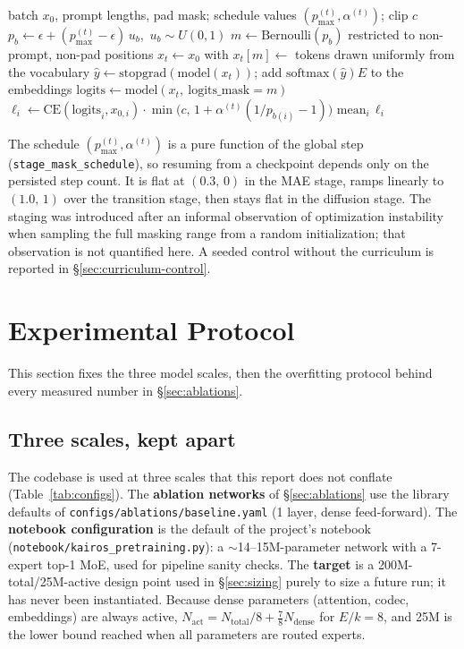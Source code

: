 \documentclass[11pt]{article}
\begin{document}
\begin{algorithm}[t]
\caption{Denoising training step (\texttt{compute\_loss})}
\label{alg:diffusion}
\begin{algorithmic}[1]
\Require batch $x_0$, prompt lengths, pad mask; schedule values $(p_{\max}^{(t)},\alpha^{(t)})$; clip $c$
\State $p_b\gets\epsilon+(p_{\max}^{(t)}-\epsilon)\,u_b$,\ $u_b\sim U(0,1)$ 
\State $m\gets\text{Bernoulli}(p_b)$ restricted to non-prompt, non-pad positions
\State $x_t\gets x_0$ with $x_t[m]\gets$ tokens drawn uniformly from the vocabulary
 $\hat y\gets\text{stopgrad}(\text{model}(x_t))$; add $\text{softmax}(\hat y)E$ to the embeddings \EndIf
\State $\text{logits}\gets\text{model}(x_t,\ \text{logits\_mask}=m)$ 
\State $\ell_i\gets\text{CE}(\text{logits}_i,x_{0,i})\cdot\min\big(c,\,1+\alpha^{(t)}(1/p_{b(i)}-1)\big)$
\State \Return $\text{mean}_i\,\ell_i$ 
\end{algorithmic}
\end{algorithm}

The schedule $(p_{\max}^{(t)},\alpha^{(t)})$ is a pure function of the global
step (\texttt{stage\_mask\_schedule}), so resuming from a checkpoint depends
only on the persisted step count. It is flat at $(0.3,\,0)$ in the MAE stage,
ramps linearly to $(1.0,\,1)$ over the transition stage, then stays flat in
the diffusion stage. The staging was introduced after an informal observation
of optimization instability when sampling the full masking range from a random
initialization; that observation is not quantified here. A seeded control without the
curriculum is reported in \S\ref{sec:curriculum-control}.

\section{Experimental Protocol}

This section fixes the three model scales, then the overfitting protocol behind every
measured number in \S\ref{sec:ablations}.

\subsection{Three scales, kept apart}

The codebase is used at three scales that this report does not conflate
(Table~\ref{tab:configs}). The \textbf{ablation networks} of
\S\ref{sec:ablations} use the library defaults of
\texttt{configs/ablations/baseline.yaml} (1 layer, dense feed-forward). The
\textbf{notebook configuration} is the default of the project's notebook
(\texttt{notebook/kairos\_pretraining.py}): a $\sim$14--15M-parameter network
with a 7-expert top-1 MoE, used for pipeline sanity checks. The
\textbf{target} is a 200M-total/25M-active design point used in
\S\ref{sec:sizing} purely to size a future run; it has never been
instantiated. Because dense parameters (attention, codec, embeddings) are
always active, $N_{\text{act}}=N_{\text{total}}/8+\tfrac78 N_{\text{dense}}$
for $E/k=8$, and 25M is the lower bound reached when all parameters are
routed experts.
\end{document}
